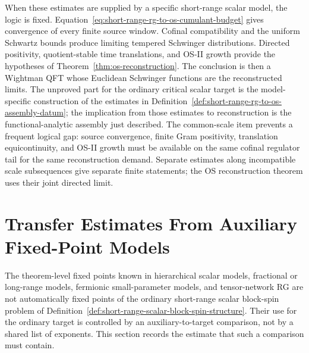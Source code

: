 When these estimates are supplied by a specific short-range scalar model, the
logic is fixed.  Equation~\eqref{eq:short-range-rg-to-os-cumulant-budget}
gives convergence of every finite source window.  Cofinal compatibility and
the uniform Schwartz bounds produce limiting tempered Schwinger
distributions.  Directed positivity, quotient-stable time translations, and
OS-II growth provide the hypotheses of
Theorem~\ref{thm:os-reconstruction}.  The conclusion is then a Wightman QFT
whose Euclidean Schwinger functions are the reconstructed limits.  The
unproved part for the ordinary critical scalar target is the model-specific
construction of the estimates in
Definition~\ref{def:short-range-rg-to-os-assembly-datum}; the implication
from those estimates to reconstruction is the functional-analytic assembly
just described.
The common-scale item prevents a frequent logical gap: source convergence,
finite Gram positivity, translation equicontinuity, and OS-II growth must be
available on the same cofinal regulator tail for the same reconstruction
demand.  Separate estimates along incompatible scale subsequences give
separate finite statements; the OS reconstruction theorem uses their joint
directed limit.

\section{Transfer Estimates From Auxiliary Fixed-Point Models}
\label{sec:auxiliary-rg-transfer-estimates}

The theorem-level fixed points known in hierarchical scalar models,
fractional or long-range models, fermionic small-parameter models, and
tensor-network RG are not automatically fixed points of the ordinary
short-range scalar block-spin problem of
Definition~\ref{def:short-range-scalar-block-spin-structure}.  Their use for the
ordinary target is controlled by an auxiliary-to-target comparison, not by a
shared list of exponents.  This section records the estimate that such a
comparison must contain.

